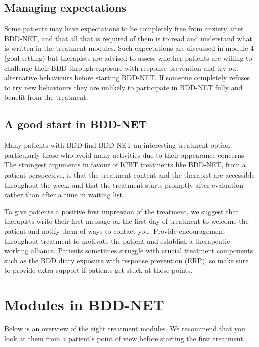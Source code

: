 \documentclass[]{book}
\theoremstyle{definition}
\theoremstyle{definition}
\theoremstyle{definition}
\theoremstyle{remark}
\begin{document}
\hypertarget{managing-expectations}{%
\subsection{Managing expectations}\label{managing-expectations}}

Some patients may have expectations to be completely free from anxiety
after BDD-NET, and that all that is required of them is to read and
understand what is written in the treatment modules. Such expectations
are discussed in module 4 (goal setting) but therapists are advised to
assess whether patients are willing to challenge their BDD through
exposure with response prevention and try out alternative behaviours
before starting BDD-NET. If someone completely refuses to try new
behaviours they are unlikely to participate in BDD-NET fully and benefit
from the treatment.

\hypertarget{a-good-start-in-bdd-net}{%
\subsection{A good start in BDD-NET}\label{a-good-start-in-bdd-net}}

Many patients with BDD find BDD-NET an interesting treatment option,
particularly those who avoid many activities due to their appearance
concerns. The strongest arguments in favour of ICBT treatments like
BDD-NET, from a patient perspective, is that the treatment content and
the therapist are accessible throughout the week, and that the treatment
starts promptly after evaluation rather than after a time in waiting
list.

To give patients a positive first impression of the treatment, we
suggest that therapists write their first message on the first day of
treatment to welcome the patient and notify them of ways to contact you.
Provide encouragement throughout treatment to motivate the patient and
establish a therapeutic working alliance. Patients sometimes struggle
with crucial treatment components such as the BDD diary exposure with
response prevention (ERP), so make sure to provide extra support if
patients get stuck at those points.

\hypertarget{modules-in-bdd-net}{%
\section{Modules in BDD-NET}\label{modules-in-bdd-net}}

Below is an overview of the eight treatment modules. We recommend that
you look at them from a patient's point of view before starting the
first treatment.
\end{document}
